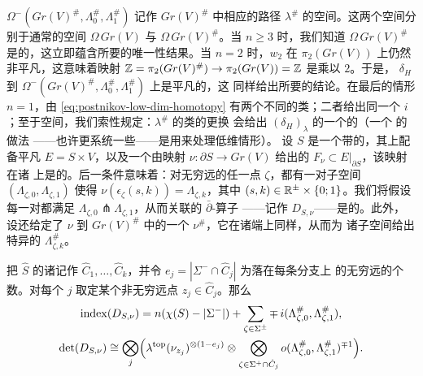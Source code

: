 $\Omega^-(Gr(V)^\#,\Lambda_0^\#,\Lambda_1^\#)$ 记作 $Gr(V)^\#$ 中相应的路径
$\lambda^\#$ 的空间。这两个空间分别\trHomotopyEquivalence{}于通常的\trLoop{}空间
$\Omega\,Gr(V)$ 与 $\Omega\,Gr(V)^\#$。当 $n\ge 3$ 时，我们知道
$\Omega\,Gr(V)^\#$ 是\trSimplyConnected{}的，这立即蕴含所要的唯一性结果。当
$n=2$ 时，$w_2$ 在 $\pi_2(Gr(V))$ 上仍然非平凡，这意味着映射
$\mathbb{Z}=\pi_2(Gr(V)^\#)\to\pi_2(Gr(V))=\mathbb{Z}$ 是乘以 $2$。于是，\trLineBundle{}
$\delta_H$ \trPullback{}到 $\Omega^-(Gr(V)^\#,\Lambda_0^\#,\Lambda_1^\#)$ 上是平凡的，这
同样给出所要的结论。在最后的情形 $n=1$，由
\eqref{eq:postnikov-low-dim-homotopy} 有两个不同的\trHomotopy{}类；二者给出同一个
$i$；至于\trOrientation{}空间，我们索性规定：$\lambda^\#$ 的\trHomotopy{}类的更换
会给出
$(\delta_H)_\lambda$ 的一个\trOrientationReversing{}的\trAutomorphism（一个%
\trEquivalence{}的做法
——也许更系统一些——是用\trStabilization{}来处理低维情形）。
设 $S$ 是一个带\trStriplikeEnd{}的\trRiemann\trSurface，其上配备平凡\trSymplectic
\trVectorBundle{} $E=S\times V$，以及一个由映射 $\nu\colon\partial S\to Gr(V)$
给出的\trLagrange\trSubbundle{} $F_\nu\subset E|_{\partial S}$，该映射在诸%
\trStriplikeEnd{}上是\trLocallyConstant{}的。后一条件意味着：对无穷远的任一点
$\zeta$，都有一对\trLagrange{}子空间 $(\Lambda_{\zeta,0},\Lambda_{\zeta,1})$ 使得
$\nu(\epsilon_\zeta(s,k))=\Lambda_{\zeta,k}$，其中
$(s,k)\in\mathbb{R}^{\pm}\times\{0;1\}$。我们将假设每一对都满足
$\Lambda_{\zeta,0}\pitchfork\Lambda_{\zeta,1}$，从而关联的 $\bar\partial$-算子
——记作 $D_{S,\nu}$——是\trNondegenerate{}的。此外，设还给定了 $\nu$ 到
$Gr(V)^\#$ 中的一个\trLift{} $\nu^\#$，它在诸端上同样\trLocallyConstant，从而为
诸\trLagrange{}子空间给出特异的\trPreimage{} $\Lambda_{\zeta,k}^\#$。
\begin{proposition}\label{thm:general-surface-index-formula}
把\trCompactification{} $\hat{S}$ 的诸\trBoundaryComponent{}记作
$\hat{C}_1,\ldots,\hat{C}_k$，并令 $e_j=|\Sigma^-\cap\hat{C}_j|$ 为落在每条分支上
的无穷远\trIncomingPoint{}的个数。对每个 $j$ 取定某个非无穷远点
$z_j\in\hat{C}_j$。那么
\begin{equation}\label{eq:general-surface-index-formula}
\begin{gathered}
\mathrm{index}(D_{S,\nu})=n(\chi(S)-|\Sigma^-|)
+\sum_{\zeta\in\Sigma^{\pm}}\mp\,i(\Lambda_{\zeta,0}^\#,\Lambda_{\zeta,1}^\#),\\
\det(D_{S,\nu})\cong\bigotimes_j\Bigl(\lambda^{\mathrm{top}}(\nu_{z_j})^{\otimes(1-e_j)}
\otimes\bigotimes_{\zeta\in\Sigma^+\cap\hat{C}_j}
o(\Lambda_{\zeta,0}^\#,\Lambda_{\zeta,1}^\#)^{\mp 1}\Bigr).
\end{gathered}
\end{equation}
\end{proposition}
